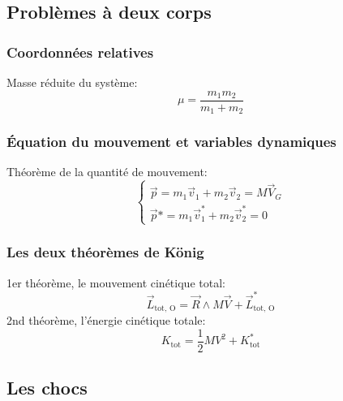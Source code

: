 \documentclass{article}
\numberwithin{equation}{section}
\begin{document}
\subsection{Problèmes à deux corps}

\subsubsection{Coordonnées relatives} %
Masse réduite du système:
\begin{equation}
	\boxed{ \mu = \frac{m_1m_2}{m_1 + m_2} }
\end{equation}

\subsubsection{Équation du mouvement et variables dynamiques} %
Théorème de la quantité de mouvement:
\begin{equation}
	\begin{cases}
		\vec p = m_1 \vec v_1 + m_2 \vec v_2 = M \vec V_G \\
		\vec p * = m_1 \vec v_1^* + m_2 \vec v_2^* = 0
	\end{cases}
\end{equation}

\subsubsection{Les deux théorèmes de König}
1er théorème, le mouvement cinétique total:
\begin{equation}
	\boxed{ \vec L_\text{tot, O} = \vec R \wedge M \vec V + \vec L_\text{tot, O}^* }
\end{equation}
2nd théorème, l'énergie cinétique totale:
\begin{equation}
	K_\text{tot} = \frac{1}{2}MV^2 + K_\text{tot}^*
\end{equation}

\subsection{Les chocs}
\end{document}
